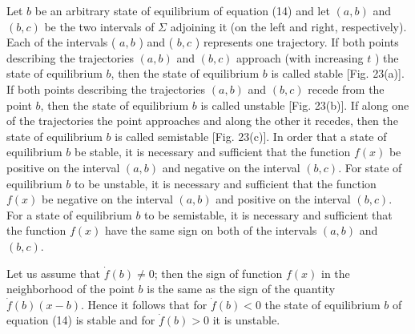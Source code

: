 \documentclass[10pt,a5paper]{book}
\theoremstyle{plain}
\theoremstyle{definition}
\theoremstyle{remark}
\begin{document}
Let $b$ be an arbitrary state of equilibrium of equation (14) and let $(a, b)$ and $(b, c)$ be the two intervals of $\Sigma$ adjoining it (on the left and right, respectively). Each of the intervals ( $a, b$ ) and ( $b, c$ ) represents one trajectory. If both points describing the trajectories $(a, b)$ and $(b, c)$ approach (with increasing $t$ ) the state of equilibrium $b$, then the state of equilibrium $b$ is called stable [Fig. 23(a)]. If both points describing the
trajectories $(a, b)$ and $(b, c)$ recede from the point $b$, then the state of equilibrium $b$ is called unstable [Fig. 23(b)]. If along one of the trajectories the point approaches and along the other it recedes, then the state of equilibrium $b$ is called semistable [Fig. 23(c)]. In order that a state of equilibrium $b$ be stable, it is necessary and sufficient that the function $f(x)$ be positive on the interval $(a, b)$ and negative on the interval $(b, c)$. For state of equilibrium $b$ to be unstable, it is necessary and sufficient that the function $f(x)$ be negative on the interval $(a, b)$ and positive on the interval $(b, c)$. For a state of equilibrium $b$ to be semistable, it is necessary and sufficient that the function $f(x)$ have the same sign on both of the intervals $(a, b)$ and $(b, c)$.

Let us assume that $\dot{f}(b) \neq 0$; then the sign of function $f(x)$ in the neighborhood of the point $b$ is the same as the sign of the quantity $\dot{f}(b)(x-b)$. Hence it follows that for $\dot{f}(b)<0$ the state of equilibrium $b$ of equation (14) is stable and for $\dot{f}(b)>0$ it is unstable.
\end{document}
